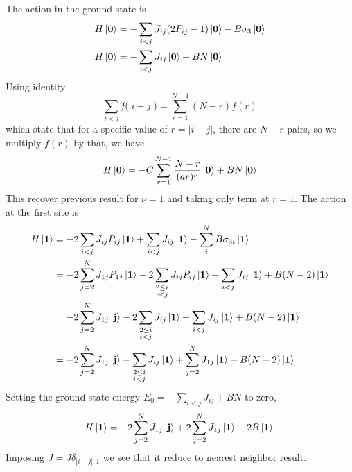 \documentclass[../../../main.tex]{subfiles}
\begin{document}
The action in the ground state is
\begin{align*}
    H \ket{\mathbf{0}} & =  -\sum_{i<j}J_{ij}  (2P_{ij}-1)\ket{\mathbf{0}}   - B\sigma_3 \ket{\mathbf{0}} \\
    H \ket{\mathbf{0}} & =  -\sum_{i<j}J_{ij}\ket{\mathbf{0}} + B N \ket{\mathbf{0}}
\end{align*}
Using identity
\begin{equation*}
    \sum_{i<j} f\big(|i-j|\big) = \sum_{r=1}^{N-1} (N-r)f(r)
\end{equation*}
which state that for a specific value of $r=|i-j|$, there are $N-r$ pairs, so we multiply $f(r)$ by that, we have
\begin{equation*}
    H \ket{\mathbf{0}} = -C \sum_{r=1}^{N-1} \frac{N-r}{(a r)^{\nu}} \ket{\mathbf{0}} + BN \ket{\mathbf{0}}
\end{equation*}
This recover previous result for $\nu=1$ and taking only term at $r=1$.
The action at the first site is
\begin{align*}
    H \ket{\mathbf{1}}
     & =   -2\sum_{i<j}J_{ij}  P_{ij}\ket{\mathbf{1}}  + \sum_{i<j} J_{ij}\ket{\mathbf{1}} - \sum_{i } ^N B \sigma_{3i}\ket{\mathbf{1}} \\
     & =   -2 \sum_{j=2}^{N}  J_{1j} P_{1j} \ket{\mathbf{1}} - 2\sum_{\substack{2\leq i                                                 \\i<j}} J_{ij}  P_{ij}\ket{\mathbf{1}} + \sum_{i<j}  J_{ij} \ket{\mathbf{1}} + B(N-2)\ket{\mathbf{1}} \\
     & =   -2 \sum_{j=2}^{N}  J_{1j} \ket{\mathbf{j}} - 2\sum_{\substack{2\leq i                                                        \\i<j}} J_{ij} \ket{\mathbf{1}} + \sum_{i<j}  J_{ij} \ket{\mathbf{1}} + B(N-2)\ket{\mathbf{1}} \\
     & =   -2 \sum_{j=2}^{N}  J_{1j} \ket{\mathbf{j}} -\sum_{\substack{2\leq i                                                          \\i<j}} J_{ij} \ket{\mathbf{1}} + \sum_{j=2}^{N} J_{1j} \ket{\mathbf{1}}  + B(N-2)\ket{\mathbf{1}}
\end{align*}
Setting the ground state energy $E_0 = -\sum_{i<j}J_{ij}+BN $ to zero,
\begin{equation*}
    H \ket{\mathbf{1}}  =   -2 \sum_{j=2}^{N}  J_{1j} \ket{\mathbf{j}} +2 \sum_{j=2}^{N} J_{1j} \ket{\mathbf{1}}  -2B\ket{\mathbf{1}} \\
\end{equation*}
Imposing $J= J\delta_{|i-j|,1}$ we see that it reduce to nearest neighbor result.
\end{document}
